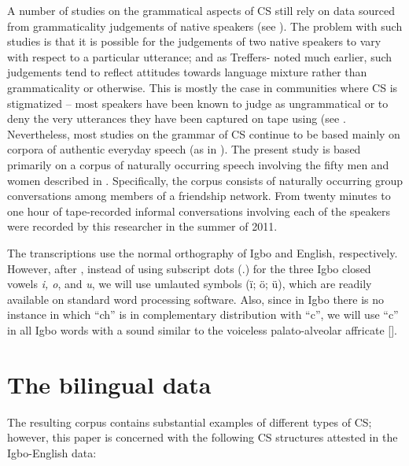 \documentclass[output=paper]{langsci/langscibook}
\begin{document}
A number of studies on the grammatical aspects of CS still rely on data sourced from grammaticality judgements of native speakers (see \citealt{MacSwan2009}). The problem with such studies is that it is possible for the judgements of two native speakers to vary with respect to a particular utterance; and as Treffers-\citet{Daller1991} noted much earlier, such judgements tend to reflect attitudes towards language mixture rather than grammaticality or otherwise. This is mostly the case in communities where CS is stigmatized – most speakers have been known to judge as ungrammatical or to deny the very utterances they have been captured on tape using (see \citealt[99]{MacSwan1999}. Nevertheless, most studies on the grammar of CS continue to be based mainly on corpora of authentic everyday speech (as in \citealt{MyersScottonJake2014}). The present study is based primarily on a corpus of naturally occurring speech involving the fifty men and women described in . Specifically, the corpus consists of naturally occurring group conversations among members of a friendship network. From twenty minutes to one hour of tape-recorded informal conversations involving each of the speakers were recorded by this researcher in the summer of 2011. 

The transcriptions use the normal orthography of Igbo and English, respectively. However, after \citet{Echeruo1998}, instead of using subscript dots (.) for the three Igbo closed vowels \textit{i, o}, and \textit{u}, we will use umlauted symbols (ï; ö; ü), which are readily available on standard word processing software. Also, since in Igbo there is no instance in which “ch” is in complementary distribution with “c”, we will use “c” in all Igbo words with a sound similar to the voiceless palato-alveolar affricate []. 

\section{The bilingual data}

The resulting corpus contains substantial examples of different types of CS; however, this paper is concerned with the following CS structures attested in the Igbo-English data:
\end{document}
